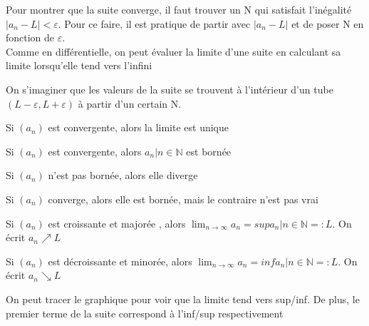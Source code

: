 \documentclass{article}
\begin{document}
\begin{problem}
    Pour montrer que la suite converge, il faut trouver un N qui satisfait
    l'inégalité $|a_n - L| < \varepsilon$. Pour ce faire, il est pratique de
    partir avec $|a_n - L|$ et de poser N en fonction de $\varepsilon$.\\
    Comme en différentielle, on peut évaluer la limite d'une suite en calculant
    sa limite lorsqu'elle tend vers l'infini
\end{problem}

\begin{intuition}
    On s'imaginer que les valeurs de la suite se trouvent à l'intérieur d'un
    tube $(L-\varepsilon, L+\varepsilon)$ à partir d'un certain N.
\end{intuition}

\begin{theorem}
    Si $(a_n)$ est convergente, alors la limite est unique
\end{theorem}

\begin{theorem}
Si $(a_n)$ est convergente, alors $a_n | n \in \mathbb{N} $ est bornée
\end{theorem}

\begin{corollary}
    Si $(a_n)$ n'est pas bornée, alors elle diverge
\end{corollary}

\begin{remark}
    Si $(a_n)$ converge, alors elle est bornée, mais le contraire n'est pas vrai
\end{remark}

\begin{theorem}
\item Si $(a_n)$ est croissante et majorée , alors $\lim_{n \to \infty} a_n =
    sup {a_n | n \in \mathbb{N} =: L}$. On écrit $a_n \nearrow L$
\item Si $(a_n)$ est décroissante et minorée, alors $\lim_{n \to \infty} a_n =
    inf{a_n | n \in \mathbb{N} =: L}$. On écrit $a_n \searrow L$
\end{theorem}

\begin{remark}
    On peut tracer le graphique pour voir que la limite tend vers sup/inf.
    De plus, le premier terme de la suite correspond à l'inf/sup respectivement
\end{remark}
\end{document}
